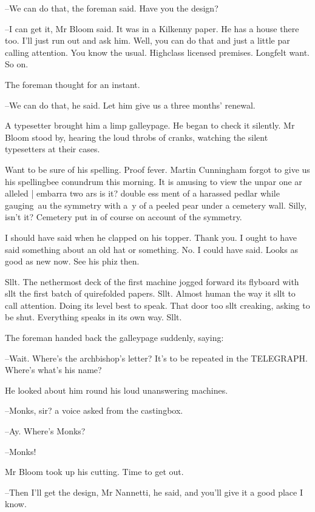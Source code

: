 --We can do that,
the foreman said.
Have you the design?

--I can get it,
Mr Bloom said.
It was in a Kilkenny paper.
He has a house there too.
I'll just run out and ask him.
Well, you can do that and just a little par calling attention.
You know the usual.
Highclass licensed premises.
Longfelt want.
So on.

The foreman thought for an instant.

--We can do that,
he said.
Let him give us a three months' renewal.

A typesetter brought him a limp galleypage.
He began to check it silently.
Mr Bloom stood by,
hearing the loud throbs of cranks,
watching the silent typesetters at their cases.



Want to be sure of his spelling.
Proof fever.
Martin Cunningham forgot to give us his spellingbee conundrum this morning.
It is amusing to view the
unpar one ar alleled |
embarra two ars is it?
double ess ment of a harassed pedlar
while gauging~au
the symmetry with a~y
of a peeled pear
under a cemetery wall.
Silly, isn't it?
Cemetery put in of course
on account of the symmetry.

I should have said when he clapped on his topper.
Thank you.
I ought to have said something about an old hat or something.
No.
I could have said.
Looks as good as new now.
See his phiz then.

Sllt.
The nethermost deck of the first machine
jogged forward its flyboard
with sllt
the first batch of quirefolded papers.
Sllt.
Almost human the way it sllt to call attention.
Doing its level best to speak.
That door too sllt creaking, asking to be shut.
Everything speaks in its own way.
Sllt.



The foreman handed back the galleypage suddenly,
saying:

--Wait.
Where's the archbishop's letter?
It's to be repeated in the TELEGRAPH.
Where's what's his name?

He looked about him round his loud unanswering machines.

--Monks, sir?
a voice asked from the castingbox.

--Ay.
Where's Monks?

--Monks!

Mr Bloom took up his cutting.
Time to get out.

--Then I'll get the design, Mr Nannetti,
he said,
and you'll give it a good place I know.


